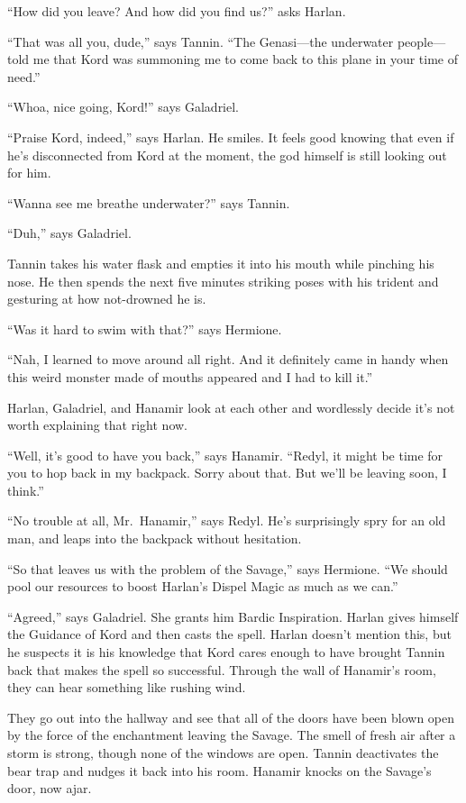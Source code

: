 \documentclass[smalldemyvopaper,11pt,twoside,onecolumn,openright,extrafontsizes]{memoir}
\begin{document}
``How did you leave? And how did you find us?'' asks Harlan.

``That was all you, dude,'' says Tannin. ``The Genasi---the underwater
people---told me that Kord was summoning me to come back to this plane
in your time of need.''

``Whoa, nice going, Kord!'' says Galadriel.

``Praise Kord, indeed,'' says Harlan. He smiles. It feels good knowing
that even if he's disconnected from Kord at the moment, the god himself
is still looking out for him.

``Wanna see me breathe underwater?'' says Tannin.

``Duh,'' says Galadriel.

Tannin takes his water flask and empties it into his mouth while
pinching his nose. He then spends the next five minutes striking poses
with his trident and gesturing at how not-drowned he is.

``Was it hard to swim with that?'' says Hermione.

``Nah, I learned to move around all right. And it definitely came in
handy when this weird monster made of mouths appeared and I had to kill
it.''

Harlan, Galadriel, and Hanamir look at each other and wordlessly decide
it's not worth explaining that right now.

``Well, it's good to have you back,'' says Hanamir. ``Redyl, it might be
time for you to hop back in my backpack. Sorry about that. But we'll be
leaving soon, I think.''

``No trouble at all, Mr.~Hanamir,'' says Redyl. He's surprisingly spry
for an old man, and leaps into the backpack without hesitation.

``So that leaves us with the problem of the Savage,'' says Hermione.
``We should pool our resources to boost Harlan's Dispel Magic as much as
we can.''

``Agreed,'' says Galadriel. She grants him Bardic Inspiration. Harlan
gives himself the Guidance of Kord and then casts the spell. Harlan
doesn't mention this, but he suspects it is his knowledge that Kord
cares enough to have brought Tannin back that makes the spell so
successful. Through the wall of Hanamir's room, they can hear something
like rushing wind.

They go out into the hallway and see that all of the doors have been
blown open by the force of the enchantment leaving the Savage. The smell
of fresh air after a storm is strong, though none of the windows are
open. Tannin deactivates the bear trap and nudges it back into his room.
Hanamir knocks on the Savage's door, now ajar.
\end{document}
